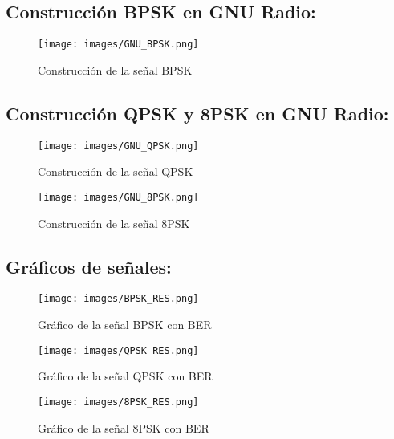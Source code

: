 \documentclass[12pt]{article}
\begin{document}
\subsection*{Construcción BPSK en GNU Radio:}

\begin{figure}[!h]
    \centering
    \texttt{[image: images/GNU\_BPSK.png]}
    \caption{Construcción de la señal BPSK}
    \label{fig:BPSK}
\end{figure}

\newpage
\subsection*{Construcción QPSK y 8PSK en GNU Radio:}

\begin{figure}[!h]
    \centering
    \texttt{[image: images/GNU\_QPSK.png]}
    \caption{Construcción de la señal QPSK}
    \label{fig:QPSK}
\end{figure}

\begin{figure}[!h]
    \centering
    \texttt{[image: images/GNU\_8PSK.png]}
    \caption{Construcción de la señal 8PSK}
    \label{fig:8PSK}
\end{figure}


\newpage
\subsection*{Gráficos de señales:}

\begin{figure}[!h]
    \centering
    \texttt{[image: images/BPSK\_RES.png]}
    \caption{Gráfico de la señal BPSK con BER}
    \label{fig:BPSK_RES}
\end{figure}

\begin{figure}[!h]
    \centering
    \texttt{[image: images/QPSK\_RES.png]}
    \caption{Gráfico de la señal QPSK con BER}
    \label{fig:QPSK_RES}
\end{figure}
\newpage

\begin{figure}[!h]
    \centering
    \texttt{[image: images/8PSK\_RES.png]}
    \caption{Gráfico de la señal 8PSK con BER}
    \label{fig:8PSK_RES}
\end{figure}
\end{document}
